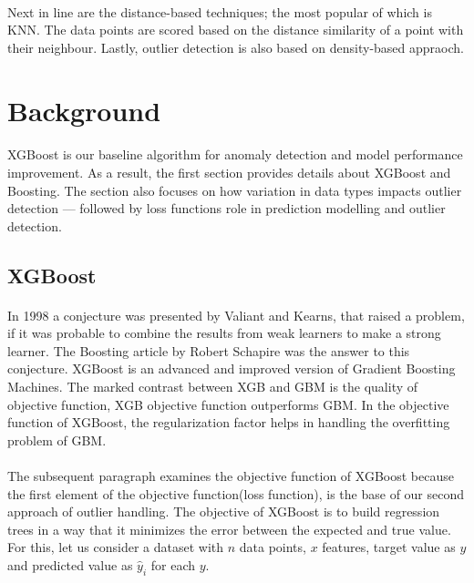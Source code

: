 \documentclass[runningheads]{llncs}
\begin{document}
\paragraph{} Next in line are the distance-based techniques; the most popular of which is KNN. The data points are scored based on the distance similarity of a point with their neighbour. Lastly, outlier detection is also based on density-based appraoch. 


\section{Background}
\paragraph{} XGBoost is our baseline algorithm for anomaly detection and model performance improvement. As a result, the first section provides details about XGBoost and Boosting. The section also focuses on how variation in data types impacts outlier detection — followed by loss functions role in prediction modelling and outlier detection.

\subsection{XGBoost}
\paragraph{ }In 1998 a conjecture was presented by Valiant and Kearns, that raised a problem, if it was probable to combine the results from weak learners to make a strong learner. The Boosting article by Robert Schapire was the answer to this conjecture. XGBoost is an advanced and improved version of Gradient Boosting Machines. The marked contrast between XGB and GBM is the quality of objective function, XGB objective function outperforms GBM. In the objective function of XGBoost, the regularization factor helps in handling the overfitting problem of GBM.

\paragraph{} The subsequent paragraph examines the objective function of XGBoost because the first element of the objective function(loss function), is the base of our second approach of outlier handling. The objective of XGBoost is to build regression trees in a way that it minimizes the error between the expected and true value. For this, let us consider a dataset with $n$ data points, $x$  features, target value as $y$ and predicted value as $\hat{y}_i$ for each $y$.
\end{document}
